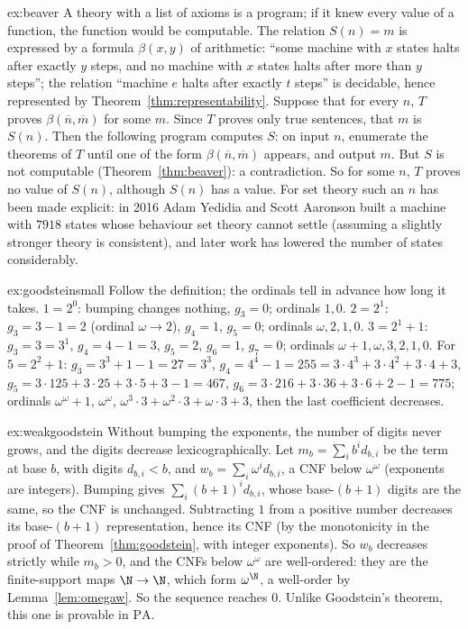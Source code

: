 \begin{solution}{ex:beaver}
\idea A theory with a list of axioms is a program; if it knew every value of a function, the function would be computable.
\writeup The relation $S(n)=m$ is expressed by a formula $\beta(x,y)$ of arithmetic: ``some machine with $x$ states halts after exactly $y$ steps, and no machine with $x$ states halts after more than $y$ steps''; the relation ``machine $e$ halts after exactly $t$ steps'' is decidable, hence represented by Theorem~\ref{thm:representability}. Suppose that for every $n$, $T$ proves $\beta(\overline n,\overline m)$ for some $m$. Since $T$ proves only true sentences, that $m$ is $S(n)$. Then the following program computes $S$: on input $n$, enumerate the theorems of $T$ until one of the form $\beta(\overline n,\overline m)$ appears, and output $m$. But $S$ is not computable (Theorem~\ref{thm:beaver}): a contradiction. So for some $n$, $T$ proves no value of $S(n)$, although $S(n)$ has a value. For set theory such an $n$ has been made explicit: in 2016 Adam Yedidia and Scott Aaronson built a machine with $7918$ states whose behaviour set theory cannot settle (assuming a slightly stronger theory is consistent), and later work has lowered the number of states considerably.
\end{solution}

\begin{solution}{ex:goodsteinsmall}
\idea Follow the definition; the ordinals tell in advance how long it takes.
\writeup $1=2^0$: bumping changes nothing, $g_3=0$; ordinals $1,0$. $2=2^1$: $g_3=3-1=2$ (ordinal $\omega\to2$), $g_4=1$, $g_5=0$; ordinals $\omega,2,1,0$. $3=2^1+1$: $g_3=3=3^1$, $g_4=4-1=3$, $g_5=2$, $g_6=1$, $g_7=0$; ordinals $\omega+1,\omega,3,2,1,0$. For $5=2^{2}+1$: $g_3=3^3+1-1=27=3^3$, $g_4=4^4-1=255=3\cdot4^3+3\cdot4^2+3\cdot4+3$, $g_5=3\cdot125+3\cdot25+3\cdot5+3-1=467$, $g_6=3\cdot216+3\cdot36+3\cdot6+2-1=775$; ordinals $\omega^\omega+1$, $\omega^\omega$, $\omega^3\cdot3+\omega^2\cdot3+\omega\cdot3+3$, then the last coefficient decreases.
\end{solution}

\begin{solution}{ex:weakgoodstein}
\idea Without bumping the exponents, the number of digits never grows, and the digits decrease lexicographically.
\writeup Let $m_b=\sum_{i}b^id_{b,i}$ be the term at base $b$, with digits $d_{b,i}<b$, and $w_b=\sum_i\omega^id_{b,i}$, a CNF below $\omega^\omega$ (exponents are integers). Bumping gives $\sum_i(b+1)^id_{b,i}$, whose base-$(b+1)$ digits are the same, so the CNF is unchanged. Subtracting $1$ from a positive number decreases its base-$(b+1)$ representation, hence its CNF (by the monotonicity in the proof of Theorem~\ref{thm:goodstein}, with integer exponents). So $w_b$ decreases strictly while $m_b>0$, and the CNFs below $\omega^\omega$ are well-ordered: they are the finite-support maps $\N\to\N$, which form $\omega^{\N}$, a well-order by Lemma~\ref{lem:omegaw}. So the sequence reaches $0$. Unlike Goodstein's theorem, this one is provable in $\mathrm{PA}$.
\end{solution}

